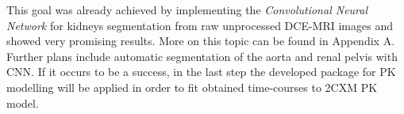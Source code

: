 This goal was already achieved by implementing the \textit{Convolutional Neural Network} for kidneys segmentation from raw unprocessed DCE-MRI images  and showed very promising results. 
More on this topic can be found in Appendix A. Further plans include automatic segmentation of the aorta and renal pelvis with CNN. If it occurs to be a success, in the last step the developed package for PK modelling will be applied in order to fit obtained time-courses to 2CXM PK model.